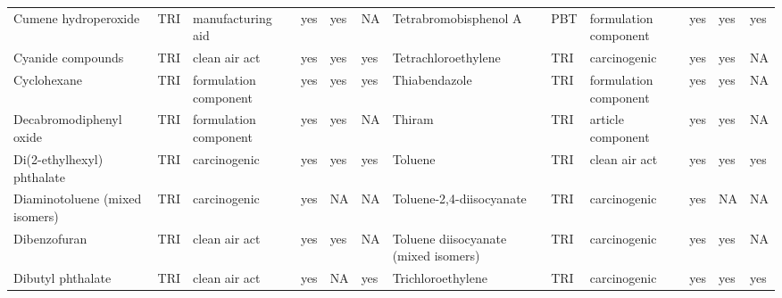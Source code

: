 \begin{table}[H]
{\begin{tabular}{llllllllllll}
            Cumene hydroperoxide                                                       & TRI            & manufacturing aid     & yes    & yes     & NA   & Tetrabromobisphenol A                                                                                              & PBT            & formulation component & yes & yes & yes\\
            Cyanide compounds                                                          & TRI            & clean air act         & yes    & yes     & yes  & Tetrachloroethylene                                                                                                & TRI            & carcinogenic & yes & yes & NA\\
            Cyclohexane                                                                & TRI            & formulation component & yes    & yes     & yes  & Thiabendazole                                                                                                      & TRI            & formulation component & yes & yes & NA\\
            Decabromodiphenyl oxide                                                    & TRI            & formulation component & yes    & yes     & NA   & Thiram                                                                                                             & TRI            & article component & yes & yes & NA\\
            Di(2-ethylhexyl) phthalate                                                 & TRI            & carcinogenic          & yes    & yes     & yes  & Toluene                                                                                                            & TRI            & clean air act & yes & yes & yes\\
            Diaminotoluene (mixed isomers)                                             & TRI            & carcinogenic          & yes    & NA      & NA   & Toluene-2,4-diisocyanate & TRI & carcinogenic & yes & NA & NA\\
            Dibenzofuran                                                               & TRI            & clean air act         & yes    & yes     & NA   & Toluene diisocyanate (mixed isomers)                                                                               & TRI & carcinogenic & yes & yes & NA\\
            Dibutyl phthalate                                                          & TRI            & clean air act         & yes    & NA      & yes  & Trichloroethylene                                                                                                  & TRI            & carcinogenic & yes & yes & yes\\

\end{tabular}}
\end{table}
